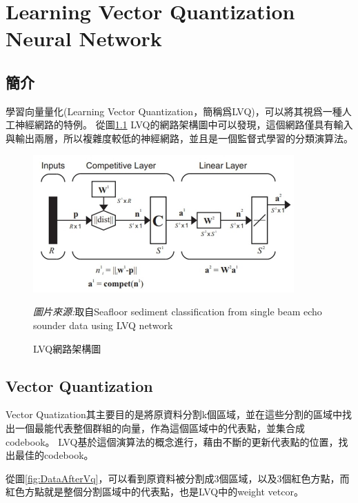 \chapter{Learning Vector Quantization Neural Network}
\label{chapter:lvq}
\section{簡介}


學習向量量化(Learning Vector Quantization，簡稱爲LVQ)，可以將其視爲一種人工神經網路的特例。
從圖\ref{fig:LvqNetwork} LVQ的網路架構圖中可以發現，這個網路僅具有輸入與輸出兩層，所以複雜度較低的神經網路，並且是一個監督式學習的分類演算法。

\begin{figure}[h]
	\centering
	\includegraphics[width=10cm]{pic/lvq_architecture.jpg}
	\caption{LVQ網路架構圖}
	\begin{minipage}{.7\linewidth}
		\footnotesize
		\emph{圖片來源:}取自Seafloor sediment classification from single beam echo sounder data using LVQ network
	\end{minipage}
	\label{fig:LvqNetwork}
\end{figure}
\label{sec:background}


\section{Vector Quantization}
Vector Quatization其主要目的是將原資料分割k個區域，並在這些分割的區域中找出一個最能代表整個群組的向量，作為這個區域中的代表點，並集合成codebook。
LVQ基於這個演算法的概念進行，藉由不斷的更新代表點的位置，找出最佳的codebook。


從圖\ref{fig:DataAfterVq}，可以看到原資料被分割成3個區域，以及3個紅色方點，而紅色方點就是整個分割區域中的代表點，也是LVQ中的weight vetcor。


